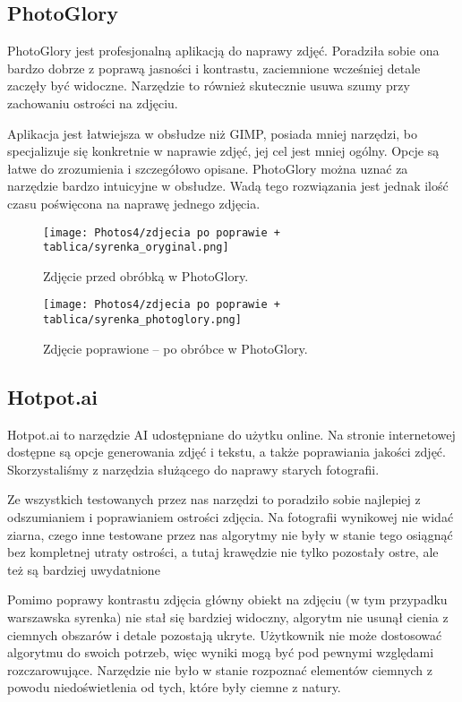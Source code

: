 \documentclass[]{mwart}
\begin{document}
\vfill
\subsection{PhotoGlory}
PhotoGlory jest profesjonalną aplikacją do naprawy zdjęć. Poradziła sobie ona bardzo dobrze z poprawą jasności i kontrastu, zaciemnione wcześniej detale zaczęły być widoczne. Narzędzie to również skutecznie usuwa szumy przy zachowaniu ostrości na zdjęciu.

Aplikacja jest łatwiejsza w obsłudze niż GIMP, posiada mniej narzędzi, bo specjalizuje się konkretnie w naprawie zdjęć, jej cel jest mniej ogólny. Opcje są łatwe do zrozumienia i szczegółowo opisane. PhotoGlory można uznać za narzędzie bardzo intuicyjne w obsłudze. Wadą tego rozwiązania jest jednak ilość czasu poświęcona na naprawę jednego zdjęcia.
\begin{figure}[H]
    \centering
    \texttt{[image: Photos4/zdjecia po poprawie + tablica/syrenka\_oryginal.png]}
    \caption{Zdjęcie przed obróbką w PhotoGlory.}
\end{figure}
\begin{figure}[H]
    \centering
    \texttt{[image: Photos4/zdjecia po poprawie + tablica/syrenka\_photoglory.png]}
    \caption{Zdjęcie poprawione -- po obróbce w PhotoGlory.}
\end{figure}



\vfill
\subsection{Hotpot.ai}
Hotpot.ai to narzędzie AI udostępniane do użytku online. Na stronie internetowej dostępne są opcje generowania zdjęć i tekstu, a także poprawiania jakości zdjęć. Skorzystaliśmy z narzędzia służącego do naprawy starych fotografii.

Ze wszystkich testowanych przez nas narzędzi to poradziło sobie najlepiej z odszumianiem i poprawianiem ostrości zdjęcia. Na fotografii wynikowej nie widać ziarna, czego inne testowane przez nas algorytmy nie były w stanie tego osiągnąć bez kompletnej utraty ostrości, a tutaj krawędzie nie tylko pozostały ostre, ale też są bardziej uwydatnione

Pomimo poprawy kontrastu zdjęcia główny obiekt na zdjęciu (w tym przypadku warszawska syrenka) nie stał się bardziej widoczny, algorytm nie usunął cienia z ciemnych obszarów i detale pozostają ukryte. Użytkownik nie może dostosować algorytmu do swoich potrzeb, więc wyniki mogą być pod pewnymi względami rozczarowujące. Narzędzie nie było w stanie rozpoznać elementów ciemnych z powodu niedoświetlenia od tych, które były ciemne z natury.
\end{document}
